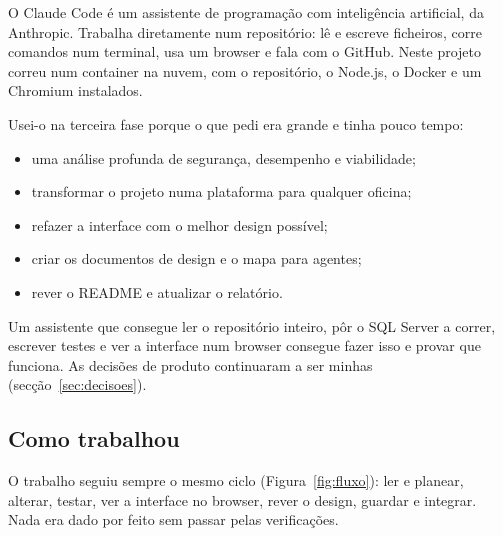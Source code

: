\documentclass[a4paper,12pt]{article}
\begin{document}
O Claude Code é um assistente de programação com inteligência artificial, da Anthropic. Trabalha diretamente num repositório: lê e escreve ficheiros, corre comandos num terminal, usa um browser e fala com o GitHub. Neste projeto correu num container na nuvem, com o repositório, o Node.js, o Docker e um Chromium instalados.

Usei-o na terceira fase porque o que pedi era grande e tinha pouco tempo:
\begin{itemize}
  \item uma análise profunda de segurança, desempenho e viabilidade;
  \item transformar o projeto numa plataforma para qualquer oficina;
  \item refazer a interface com o melhor design possível;
  \item criar os documentos de design e o mapa para agentes;
  \item rever o README e atualizar o relatório.
\end{itemize}
Um assistente que consegue ler o repositório inteiro, pôr o SQL Server a correr, escrever testes e ver a interface num browser consegue fazer isso e provar que funciona. As decisões de produto continuaram a ser minhas (secção~\ref{sec:decisoes}).

\subsection{Como trabalhou}

O trabalho seguiu sempre o mesmo ciclo (Figura~\ref{fig:fluxo}): ler e planear, alterar, testar, ver a interface no browser, rever o design, guardar e integrar. Nada era dado por feito sem passar pelas verificações.
\end{document}
